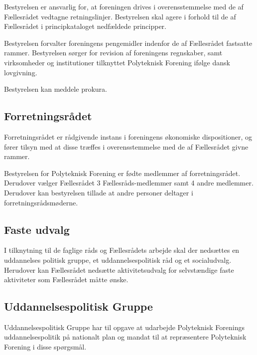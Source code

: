 \begin{list}
\item Bestyrelsen er ansvarlig for, at foreningen drives i overensstemmelse med de af Fællesrådet vedtagne retningslinjer. Bestyrelsen skal agere i forhold til de af Fællesrådet i principkataloget nedfældede principper.\\

\item Bestyrelsen forvalter foreningens pengemidler indenfor de af Fællesrådet fastsatte rammer. Bestyrelsen sørger for revision af foreningens regnskaber, samt virksomheder og institutioner tilknyttet Polyteknisk Forening ifølge dansk lovgivning.

\item Bestyrelsen kan meddele prokura.

\subsection{Forretningsrådet}
\item Forretningsrådet er rådgivende instans i foreningens økonomiske dispositioner, og fører tilsyn med at disse træffes i overensstemmelse med de af Fællesrådet givne rammer.\\

\item Bestyrelsen for Polyteknisk Forening er fødte medlemmer af forretningsrådet. Derudover vælger Fællesrådet 3 Fællesråds-medlemmer samt 4 andre medlemmer. Derudover kan bestyrelsen tillade at andre personer deltager i forretningsrådsmøderne.

\subsection{Faste udvalg}
\item I tilknytning til de faglige råds og Fællesrådets arbejde skal der nedsættes en uddannelses politisk gruppe, et uddannelsespolitisk råd og et socialudvalg. Herudover kan Fællesrådet nedsætte aktivitetsudvalg for selvstændige faste aktiviteter som Fællesrådet måtte ønske.\\

\subsection{Uddannelsespolitisk Gruppe}
\item Uddannelsespolitisk Gruppe har til opgave at udarbejde Polyteknisk Forenings uddannelsespolitik på nationalt plan og mandat til at repræsentere Polyteknisk Forening i disse spørgsmål.\\


\end{list}
